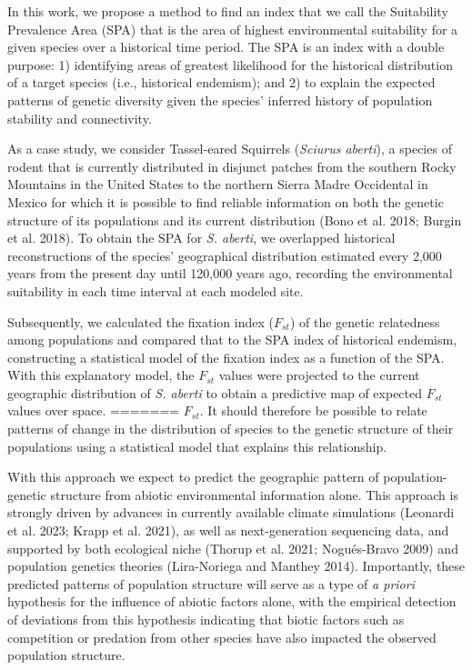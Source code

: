 \documentclass[
]{article}
\begin{document}
In this work, we propose a method to find an index that we call the
Suitability Prevalence Area (SPA) that is the area of highest
environmental suitability for a given species over a historical time
period. The SPA is an index with a double purpose: 1) identifying areas
of greatest likelihood for the historical distribution of a target
species (i.e., historical endemism); and 2) to explain the expected
patterns of genetic diversity given the species' inferred history of
population stability and connectivity.

As a case study, we consider Tassel-eared Squirrels
(\textit{Sciurus aberti}), a species of rodent that is currently
distributed in disjunct patches from the southern Rocky Mountains in the
United States to the northern Sierra Madre Occidental in Mexico for
which it is possible to find reliable information on both the genetic
structure of its populations and its current distribution (Bono et al.
2018; Burgin et al. 2018). To obtain the SPA for \textit{S. aberti}, we
overlapped historical reconstructions of the species' geographical
distribution estimated every 2,000 years from the present day until
120,000 years ago, recording the environmental suitability in each time
interval at each modeled site.

Subsequently, we calculated the fixation index (\(F_{st}\)) of the
genetic relatedness among populations and compared that to the SPA index
of historical endemism, constructing a statistical model of the fixation
index as a function of the SPA. With this explanatory model, the
\(F_{st}\) values were projected to the current geographic distribution
of \textit{S. aberti} to obtain a predictive map of expected \(F_{st}\)
values over space.
=======
\(F_{st}\). It should therefore be possible to relate patterns of change in the
distribution of species to the genetic structure of their populations
using a statistical model that explains this relationship.

With this approach we expect to predict the geographic pattern of population-genetic
structure from abiotic environmental information alone. This approach is strongly
driven by advances in currently available climate simulations (Leonardi
et al. 2023; Krapp et al. 2021), as well as next-generation sequencing
data, and supported by both ecological niche (Thorup et al. 2021;
Nogués-Bravo 2009) and population genetics theories (Lira-Noriega and
Manthey 2014). Importantly, these predicted patterns of population structure will serve as a type of \textit{a priori} hypothesis for the influence of abiotic factors alone, with the empirical detection of deviations from this hypothesis indicating that biotic factors such as competition or predation from other species have also impacted the observed population structure.
\end{document}
